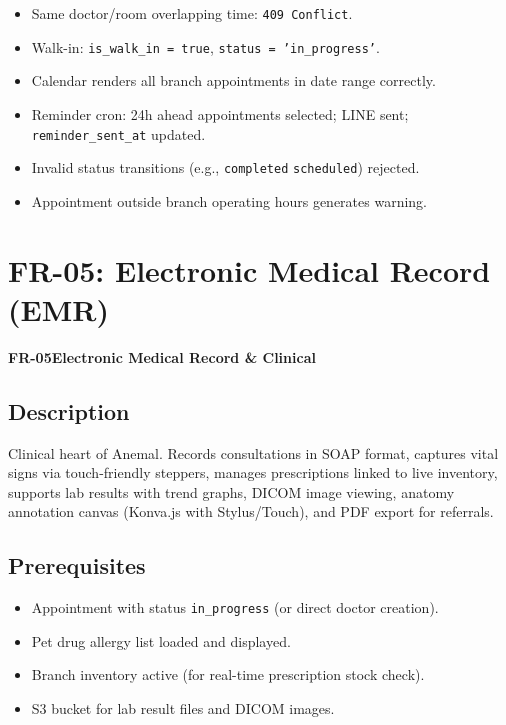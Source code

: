 \documentclass[12pt,a4paper]{report}
\newcommand{\testcheck}{\textcolor{successgreen}{\ding{51}}}
\newcommand{\moduleheader}[2]{%
  \par\vspace{6pt}%
  \noindent\colorbox{branddark}{\color{white}\textbf{\small #1}}\quad\textbf{\large #2}%
  \par\vspace{4pt}%
}
\begin{document}
\begin{itemize}
  \item[\testcheck] Same doctor/room overlapping time: \texttt{409 Conflict}.
  \item[\testcheck] Walk-in: \texttt{is\_walk\_in = true}, \texttt{status = 'in\_progress'}.
  \item[\testcheck] Calendar renders all branch appointments in date range correctly.
  \item[\testcheck] Reminder cron: 24h ahead appointments selected; LINE sent; \texttt{reminder\_sent\_at} updated.
  \item[\testcheck] Invalid status transitions (e.g., \texttt{completed} \textrightarrow{} \texttt{scheduled}) rejected.
  \item[\testcheck] Appointment outside branch operating hours generates warning.
\end{itemize}

\chapter{FR-05: Electronic Medical Record (EMR)}

\moduleheader{FR-05}{Electronic Medical Record \& Clinical}

\section{Description}

Clinical heart of Anemal. Records consultations in SOAP format, captures vital signs via touch-friendly steppers, manages prescriptions linked to live inventory, supports lab results with trend graphs, DICOM image viewing, anatomy annotation canvas (Konva.js with Stylus/Touch), and PDF export for referrals.

\section{Prerequisites}

\begin{itemize}
  \item Appointment with status \texttt{in\_progress} (or direct doctor creation).
  \item Pet drug allergy list loaded and displayed.
  \item Branch inventory active (for real-time prescription stock check).
  \item S3 bucket for lab result files and DICOM images.
\end{itemize}
\end{document}
